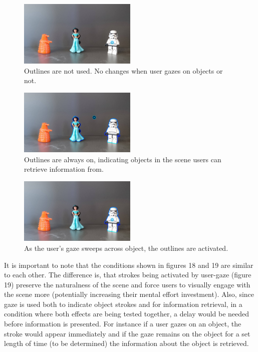 \documentclass{article}
\begin{document}
\begin{figure}[htbp]
		\vspace{0.35cm}
		\hspace{0.25\textwidth}
        \includegraphics[width=0.5\textwidth]{Images/oultlineNone.jpg}
    	\caption{Outlines are not used. No changes when user gazes on objects or not. 
        \vspace{0.35cm}
}
\end{figure}

\begin{figure}[htbp]
		\hspace{0.25\textwidth}
        \includegraphics[width=0.5\textwidth]{Images/oultlineActive.jpg}
    	\caption{Outlines are always on, indicating objects in the scene users can retrieve information from.
}
\end{figure}

\begin{figure}[htbp]
		\hspace{0.25\textwidth}
        \includegraphics[width=0.5\textwidth]{Images/oultlineGaze.jpg}
    	\caption{As the user's gaze sweeps across object, the outlines are activated.
}
\end{figure}

It is important to note that the conditions shown in figures 18 and 19 are similar to each other. The difference is, that strokes being activated by user-gaze (figure 19) preserve the naturalness of the scene and force users to visually engage with the scene more (potentially increasing their mental effort investment). Also, since gaze is used both to indicate object strokes and for information retrieval, in a condition where both effects are being tested together, a delay would be needed before information is presented. For instance if a user gazes on an object, the stroke would appear immediately and if the gaze remains on the object for a set length of time (to be determined) the information about the object is retrieved.
\end{document}
